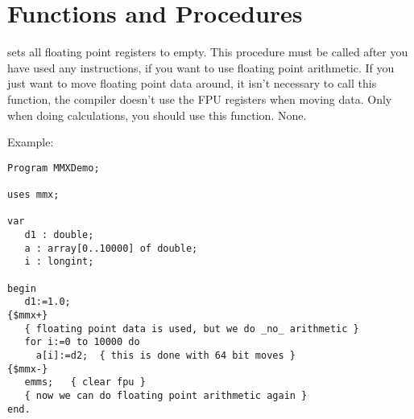 \section{Functions and Procedures}

{ sets all floating point registers to empty. This procedure must
be called after you have used any  instructions, if you want to use
floating point arithmetic. If you just want to move floating point data
around, it isn't necessary to call this function, the compiler doesn't use
the FPU registers when moving data. Only when doing calculations, you should
use this function.
}
{None.}
{ \progref }
\begin{FPCList}
\item[Example:]
\begin{verbatim}
Program MMXDemo;

uses mmx;

var
   d1 : double;
   a : array[0..10000] of double;
   i : longint;

begin
   d1:=1.0;
{$mmx+}
   { floating point data is used, but we do _no_ arithmetic }
   for i:=0 to 10000 do
     a[i]:=d2;  { this is done with 64 bit moves }
{$mmx-}
   emms;   { clear fpu }
   { now we can do floating point arithmetic again }
end. 
\end{verbatim}
\end{FPCList}
